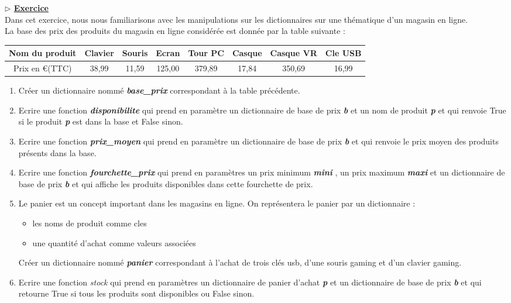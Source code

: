 \documentclass[12pt,french]{article}
\newcounter{npb}
\newcommand{\exo}{
    \stepcounter{npb}
    {\textbf{$\triangleright$ \underline{Exercice \arabic{npb} }}}
}
\begin{document}
\exo\\
Dans cet exercice, nous nous familiarisons avec les manipulations sur les dictionnaires sur une thématique d'un magasin en ligne.\\
La base des prix des produits du magasin en ligne considérée est donnée par la table suivante :
\begin{center}
\begin{tabular}{|c|c|c|c|c|c|c|c|}
	\hline
	Nom du produit&Clavier&Souris&Ecran&Tour PC&Casque&Casque VR&Cle USB\\
	\hline
	Prix en \euro (TTC)&38,99&11,59&125,00&379,89&17,84&350,69&16,99\\
	\hline
\end{tabular}
\end{center}
\begin{enumerate}
	\item Créer un dictionnaire nommé \textbf{\textsl{base\_prix}} correspondant à la table précédente.
	\item Ecrire une fonction \textbf{\textsl{disponibilite}} qui prend en paramètre un dictionnaire de base de prix \textbf{\textsl{b}} et un nom de produit \textbf{\textsl{p}} et qui renvoie True si le produit \textbf{\textsl{p}} est dans la base et False sinon. 
	\item Ecrire une fonction \textbf{\textsl{prix\_moyen}} qui prend en paramètre un dictionnaire de base de prix \textbf{\textsl{b}} et qui renvoie le prix moyen des produits présents dans la base. 
	\item Ecrire une fonction \textbf{\textsl{fourchette\_prix}} qui prend en paramètres un prix minimum \textbf{\textsl{mini}} , un prix maximum \textbf{\textsl{maxi}} et un dictionnaire de base de prix \textbf{\textsl{b}} et qui affiche les produits disponibles dans cette fourchette de prix. 
	\item Le panier est un concept important dans les magasins en ligne. On représentera le panier par un dictionnaire :
	\begin{itemize}[$\bullet$]
	\item les noms de produit comme cles
	\item une quantité d'achat comme valeurs associées
\end{itemize}
	Créer un dictionnaire nommé \textbf{\textsl{panier}} correspondant à l'achat de trois clés usb, d'une souris gaming et d'un clavier gaming. 
	\item Ecrire une fonction \textsl{stock} qui prend en paramètres un dictionnaire de panier d'achat \textbf{\textsl{p}} et un dictionnaire de base de prix \textbf{\textsl{b}} et qui retourne True si tous les produits sont disponibles ou False sinon.\\

\end{enumerate}
\end{document}
